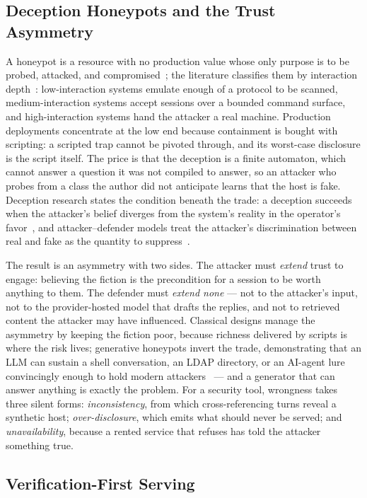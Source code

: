 \subsection{Deception Honeypots and the Trust Asymmetry}

A honeypot is a resource with no production value whose only purpose is
to be probed, attacked, and compromised~\cite{spitzner2002}; the
literature classifies them by interaction
depth~\cite{lopez2024}: low-interaction systems emulate enough of a
protocol to be scanned, medium-interaction systems accept sessions over
a bounded command surface, and high-interaction systems hand the
attacker a real machine. Production deployments concentrate at the low
end because containment is bought with scripting: a scripted trap cannot
be pivoted through, and its worst-case disclosure is the script itself.
The price is that the deception is a finite automaton, which cannot
answer a question it was not compiled to answer, so an attacker who
probes from a class the author did not anticipate learns that the host
is fake. Deception research states the condition beneath the trade: a
deception succeeds when the attacker's belief diverges from the system's
reality in the operator's favor~\cite{bera2024}, and
attacker--defender models treat the attacker's discrimination between
real and fake as the quantity to suppress~\cite{shinde2020,liska2024}.

The result is an asymmetry with two sides. The attacker must
\emph{extend} trust to engage: believing the fiction is the
precondition for a session to be worth anything to them. The defender
must \emph{extend none} --- not to the attacker's input, not to the
provider-hosted model that drafts the replies, and not to retrieved
content the attacker may have influenced. Classical designs manage the
asymmetry by keeping the fiction poor, because richness delivered by
scripts is where the risk lives; generative honeypots invert the
trade, demonstrating that an LLM can sustain a shell conversation, an
LDAP directory, or an AI-agent lure convincingly enough to hold modern
attackers~\cite{valeros2024,reworr2024,jimenez2025} --- and a generator
that can answer anything is exactly the problem. For a security tool,
wrongness takes three silent forms: \emph{inconsistency}, from which
cross-referencing turns reveal a synthetic host;
\emph{over-disclosure}, which emits what should never be served; and
\emph{unavailability}, because a rented service that refuses has told
the attacker something true.

\subsection{Verification-First Serving}

